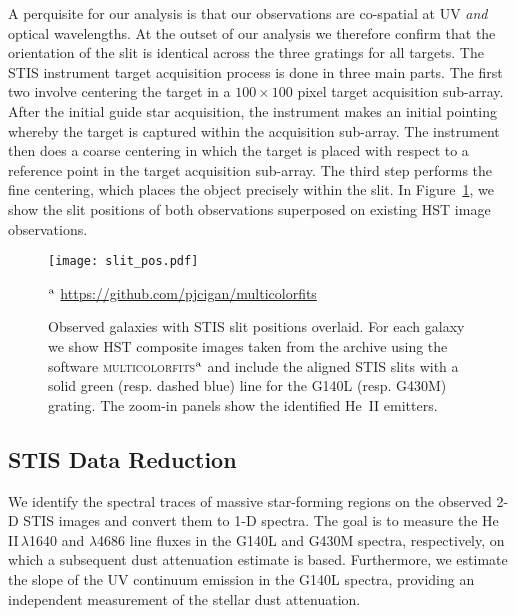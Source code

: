 \documentclass[]{aastex63}
\begin{document}
A perquisite for our analysis is that our observations are co-spatial at UV {\it and} optical wavelengths. At the outset of our analysis we therefore confirm that the orientation of the slit is identical across the three gratings for all targets. The STIS instrument target acquisition process is done in three main parts. The first two involve centering the target in a $100 \times 100$ pixel target acquisition sub-array. After the initial guide star acquisition, the instrument makes an initial pointing whereby the target is captured within the acquisition sub-array. The instrument then does a coarse centering in which the target is placed with respect to a reference point in the target acquisition sub-array. The third step performs the fine centering, which places the object precisely within the slit.
In Figure~\ref{fig:slit_alignment}, we show the slit positions of both observations superposed on existing HST image observations.
%
\begin{figure*}[h]
    \centering
    \texttt{[image: slit\_pos.pdf]}
    \caption{Observed galaxies with STIS slit positions overlaid. For each galaxy we show HST composite images taken from the archive using the software  \textsc{multicolorfits}$^{\rm a}$ and include the aligned STIS slits with a solid green (resp. dashed blue) line for the G140L (resp. G430M) grating. The zoom-in panels show the identified He~II emitters.} 
    \label{fig:slit_alignment}
    \begin{tablenotes}
    \item $^{\rm a}$ \url{https://github.com/pjcigan/multicolorfits}
    \end{tablenotes}
\end{figure*}
%

\subsection{STIS Data Reduction}\label{sec:stis_data_reduction}
We identify the spectral traces of massive star-forming regions on the observed 2-D STIS images and convert them to 1-D spectra. The goal is to measure the He\,II\,$\lambda$1640 and $\lambda$4686 line fluxes in the G140L and G430M spectra, respectively, on which a subsequent dust attenuation estimate is based. Furthermore, we estimate the slope of the UV continuum emission in the G140L spectra, providing an independent measurement of the stellar dust attenuation. 
\end{document}
